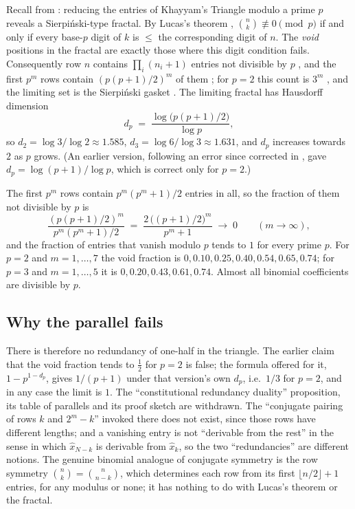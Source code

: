 \documentclass[12pt]{article}
\theoremstyle{definition}
\begin{document}
Recall from \cite{Wakil2026Khayyam}: reducing the entries of
Khayyam's Triangle modulo a prime $p$ reveals a Sierpi\'nski-type
fractal.  By Lucas's theorem \cite{Lucas1878},
$\binom{n}{k} \not\equiv 0 \pmod{p}$ if and only if every base-$p$ digit
of $k$ is $\leq$ the corresponding digit of $n$.  The \emph{void}
positions in the fractal are exactly those where this digit condition
fails.  Consequently row $n$ contains $\prod_i (n_i + 1)$ entries not
divisible by $p$ \cite{Fine1947}, and the first $p^m$ rows contain
$(p(p+1)/2)^m$ of them \cite{Wolfram1984,Reiter1993}; for $p = 2$ this
count is $3^m$ \cite{Glaisher1899,Fine1947}, and the limiting set is the
Sierpi\'nski gasket \cite{Sierpinski1915}.  The limiting fractal has
Hausdorff dimension \cite{Reiter1993}
\[
  d_p \;=\; \frac{\log\bigl(p(p+1)/2\bigr)}{\log p},
\]
so $d_2 = \log 3/\log 2 \approx 1.585$,
$d_3 = \log 6/\log 3 \approx 1.631$, and $d_p$ increases towards $2$ as
$p$ grows.  (An earlier version, following an error since corrected in
\cite{Wakil2026Khayyam}, gave $d_p = \log(p+1)/\log p$, which is correct
only for $p = 2$.)

The first $p^m$ rows contain $p^m(p^m+1)/2$ entries in all, so the
fraction of them not divisible by $p$ is
\[
  \frac{(p(p+1)/2)^m}{p^m(p^m+1)/2}
  \;=\; \frac{2\,\bigl((p+1)/2\bigr)^m}{p^m + 1}
  \;\longrightarrow\; 0
  \qquad (m \to \infty),
\]
and the fraction of entries that vanish modulo $p$ tends to $1$ for
every prime $p$.  For $p = 2$ and $m = 1, \ldots, 7$ the void fraction
is $0, 0.10, 0.25, 0.40, 0.54, 0.65, 0.74$; for $p = 3$ and
$m = 1, \ldots, 5$ it is $0, 0.20, 0.43, 0.61, 0.74$.  Almost all
binomial coefficients are divisible by $p$.

\subsection{Why the parallel fails}

There is therefore no redundancy of one-half in the triangle.  The
earlier claim that the void fraction tends to $\tfrac{1}{2}$ for $p = 2$
is false; the formula offered for it, $1 - p^{1-d_p}$, gives $1/(p+1)$
under that version's own $d_p$, i.e.\ $1/3$ for $p = 2$, and in any case
the limit is $1$.  The ``constitutional redundancy duality'' proposition,
its table of parallels and its proof sketch are withdrawn.  The
``conjugate pairing of rows $k$ and $2^m - k$'' invoked there does not
exist, since those rows have different lengths; and a vanishing entry is
not ``derivable from the rest'' in the sense in which $\hat{x}_{N-k}$ is
derivable from $\hat{x}_k$, so the two ``redundancies'' are different
notions.  The genuine binomial analogue of conjugate symmetry is the row
symmetry $\binom{n}{k} = \binom{n}{n-k}$, which determines each row from
its first $\lfloor n/2 \rfloor + 1$ entries, for any modulus or none; it
has nothing to do with Lucas's theorem or the fractal.
\end{document}
